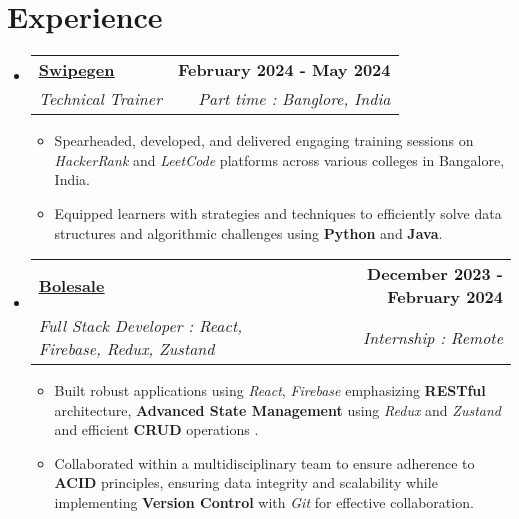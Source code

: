 \documentclass[a4paper,11pt]{article}
\makeatletter
\newcommand{\resumeSubheading}[4]{
  \vspace{-2pt}\item
    \begin{tabular*}{1.0\textwidth}[t]{l@{\extracolsep{\fill}}r}
      \textbf{#1} & \textbf{\small #2} \\
      \textit{\small#3} & \textit{\small #4} \\
    \end{tabular*}\vspace{-7pt}
}
\newcommand{\resumeSubHeadingListStart}{\begin{itemize}[leftmargin=0.0in, label={}]}
\newcommand{\resumeSubHeadingListEnd}{\end{itemize}}
\newcommand{\resumeItemListStart}{\begin{itemize}}
\newcommand{\resumeItemListEnd}{\end{itemize}\vspace{-5pt}}
\makeatother
\begin{document}
\section{Experience}
    \resumeSubHeadingListStart
    \resumeSubheading
		{\href{https://www.linkedin.com/company/swipegen/}{\underline{Swipegen}}}{February 2024 -  May 2024}
		{Technical Trainer}{Part time : Banglore, India}
		\resumeItemListStart
        \item Spearheaded, developed, and delivered engaging training sessions on \textit{HackerRank} and \textit{LeetCode} platforms across various colleges in Bangalore, India.
        \item Equipped learners with strategies and techniques to efficiently solve data structures and algorithmic challenges using \textbf{Python} and \textbf{Java}.
		\resumeItemListEnd
        \resumeSubheading
		{\href{https://seller.bolesale.com/}{\underline{Bolesale}}}{December 2023 -  February 2024}
		{Full Stack Developer : React, Firebase, Redux, Zustand}{Internship : Remote}
		\resumeItemListStart
        \item Built robust applications using \textit{React}, \textit{Firebase} emphasizing \textbf{RESTful} architecture, \textbf{Advanced State Management} using \textit{Redux} and \textit{Zustand} and efficient \textbf{CRUD} operations .
        \item Collaborated within a multidisciplinary team to ensure adherence to \textbf{ACID} principles, ensuring data integrity and scalability while implementing \textbf{Version Control} with \textit{Git} for effective collaboration.
		\resumeItemListEnd
    
 
\resumeSubHeadingListEnd


\vspace{-13pt}
\end{document}
